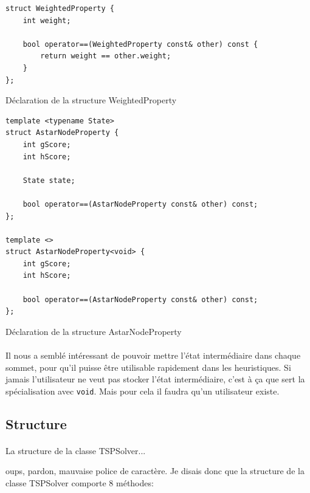 \documentclass[french]{article}
\begin{document}
\begin{listing}[H]
\begin{verbatim}
struct WeightedProperty {
	int weight;

	bool operator==(WeightedProperty const& other) const {
		return weight == other.weight;
	}
};
\end{verbatim}
\caption{Déclaration de la structure WeightedProperty}
\label{tsp:weightedprop}
\end{listing}

\begin{listing}[H]
\begin{verbatim}
template <typename State>
struct AstarNodeProperty {
	int gScore;
	int hScore;

	State state;

	bool operator==(AstarNodeProperty const& other) const;
};

template <>
struct AstarNodeProperty<void> {
	int gScore;
	int hScore;

	bool operator==(AstarNodeProperty const& other) const;
};
\end{verbatim}
\caption{Déclaration de la structure AstarNodeProperty}
\label{tsp:astarnodeprop}
\end{listing}

\paragraph{} Il nous a semblé intéressant de pouvoir mettre l'état
intermédiaire dans chaque sommet, pour qu'il puisse être utilisable rapidement
dans les heuristiques. Si jamais l'utilisateur ne veut pas stocker l'état
intermédiaire, c'est à ça que sert la spécialisation avec
\texttt{void}. Mais pour cela il faudra qu'un utilisateur existe.

\subsection{Structure}

{ \paragraph{} La structure de la classe TSPSolver...}
oups, pardon, mauvaise police de caractère. Je disais donc que la structure de
la classe TSPSolver comporte 8 méthodes:
\end{document}

